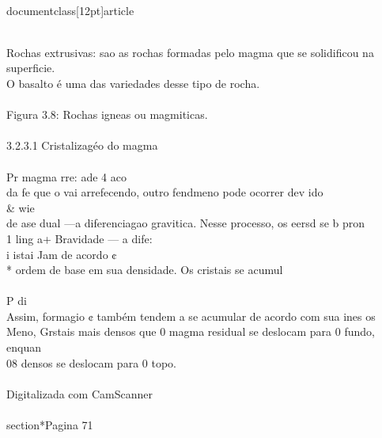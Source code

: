 \\documentclass[12pt]{article}
\begin{document}
\\
Rochas extrusivas: sao as rochas formadas pelo magma que se solidificou na superficie.\\
O basalto é uma das variedades desse tipo de rocha.\\
\\
Figura 3.8: Rochas igneas ou magmiticas.\\
\\
3.2.3.1 Cristalizagéo do magma\\
\\
Pr magma rre: ade 4 aco\\
da fe que o vai arrefecendo, outro fendmeno pode ocorrer dev ido \\& wie\\
de ase dual —a diferenciagao gravitica. Nesse processo, os eersd se b pron\\
1 ling a+ Bravidade — a dife:\\
i istai Jam de acordo ¢\\
* ordem de base em sua densidade. Os cristais se acumul\\
\\
P di\\
Assim, formagio ¢ também tendem a se acumular de acordo com sua ines os\\
Meno, Grstais mais densos que 0 magma residual se deslocam para 0 fundo, enquan\\
08 densos se deslocam para 0 topo.\\
\\
Digitalizada com CamScanner\\

\\section*{Pagina 71}
\end{document}
